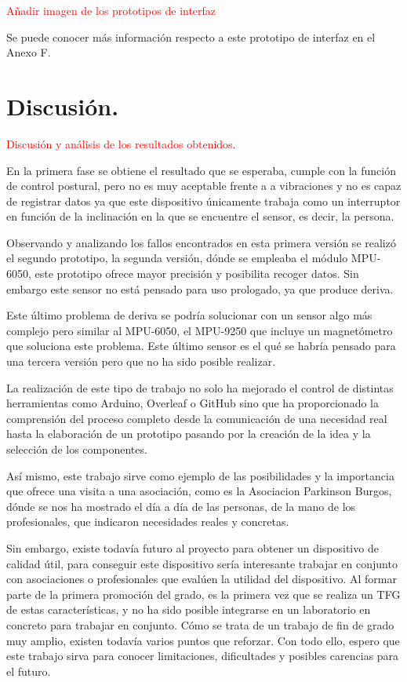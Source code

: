 \textcolor{red}{Añadir imagen de los prototipos de interfaz}

Se puede conocer más información respecto a este prototipo de interfaz en el Anexo F.


\section{Discusión.}
\textcolor{red}{Discusión y análisis de los resultados obtenidos.}

En la primera fase se obtiene el resultado que se esperaba, cumple con la función de control postural, pero no es muy aceptable frente a a vibraciones y no es capaz de registrar datos ya que este dispositivo únicamente trabaja como un interruptor en función de la inclinación en la que se encuentre el sensor, es decir, la persona.

Observando y analizando los fallos encontrados en esta primera versión se realizó el segundo prototipo, la segunda versión, dónde se empleaba el módulo MPU-6050, este prototipo ofrece mayor precisión y posibilita recoger datos. Sin embargo este sensor no está pensado para uso prologado, ya que produce deriva.

Este último problema de deriva se podría solucionar con un sensor algo más complejo pero similar al MPU-6050, el MPU-9250 que incluye un magnetómetro que soluciona este problema. Este último sensor es el qué se habría pensado para una tercera versión pero que no ha sido posible realizar.

La realización de este tipo de trabajo no solo ha mejorado el control de distintas herramientas como Arduino, Overleaf o GitHub sino que ha proporcionado la comprensión del proceso completo desde la comunicación de una necesidad real hasta la elaboración de un prototipo pasando por la creación de la idea y la selección de los componentes.

Así mismo, este trabajo sirve como ejemplo de las posibilidades y la importancia que ofrece una visita a una asociación, como es la Asociacion Parkinson Burgos, dónde se nos ha mostrado el día a día de las personas, de la mano de los profesionales, que indicaron necesidades reales y concretas. 

Sin embargo, existe todavía futuro al proyecto para obtener un dispositivo de calidad útil, para conseguir este dispositivo sería interesante trabajar en conjunto con asociaciones o profesionales que evalúen la utilidad del dispositivo. Al formar parte de la primera promoción del grado, es la primera vez que se realiza un TFG de estas características, y no ha sido posible integrarse en un laboratorio en concreto para trabajar en conjunto. Cómo se trata de un trabajo de fin de grado muy amplio, existen todavía varios puntos que reforzar. Con todo ello, espero que este trabajo sirva para conocer limitaciones, dificultades y posibles carencias para el futuro.


